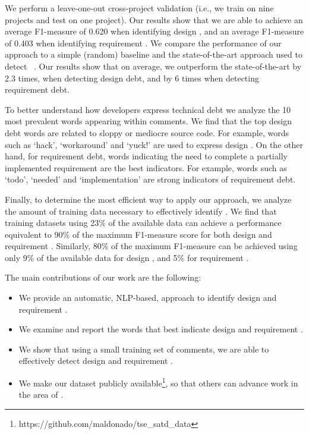 We perform a leave-one-out cross-project validation (i.e., we train on nine projects and test on one project). Our results show that we are able to  achieve an average F1-measure of 0.620 when identifying design \SATD, and an average F1-measure of 0.403 when identifying requirement \SATD. We compare the performance of our approach to a simple (random) baseline and the state-of-the-art approach used to detect \SATD~\cite{Potdar2014ICSME}. Our results show that on average, we outperform the state-of-the-art by 2.3 times, when detecting design debt, and by 6 times when detecting requirement debt.

To better understand how developers express technical debt we analyze the 10 most prevalent words appearing within \SATD comments. 
We find that the top design debt words are related to sloppy or mediocre source code. For example, words such as `hack', `workaround' and `yuck!' are used to express design \SATD. On the other hand, for requirement debt, words indicating the need to complete a partially implemented requirement are the best indicators. For example, words such as `todo', `needed' and `implementation' are strong indicators of requirement debt. 

Finally, to determine the most efficient way to apply our approach, we analyze the amount of training data necessary to effectively identify \SATD. We find that training datasets using 23\% of the available data can achieve a performance equivalent to 90\% of the maximum F1-measure score for both design and requirement \SATD. Similarly, 80\% of the maximum F1-measure can be achieved using only 9\% of the available data for design \SATD, and 5\% for requirement \SATD.

The main contributions of our work are the following:
\begin{itemize}
  \item We provide an automatic, NLP-based, approach to identify design and requirement \SATD.
  \item We examine and report the words that best indicate design and requirement \SATD.
  \item We show that using a small training set of comments, we are able to effectively detect design and requirement \SATD.
  \item We make our dataset publicly available\footnote{https://github.com/maldonado/tse\_satd\_data}, so that others can advance work in the area of \SATD.
\end{itemize}

